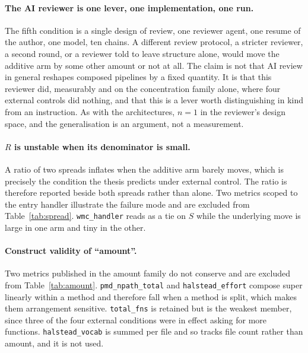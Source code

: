 \documentclass[11pt,a4paper]{article}
\begin{document}
\paragraph{The AI reviewer is one lever, one implementation, one run.} The fifth
condition is a single design of review, one reviewer agent, one resume of the
author, one model, ten chains. A different review protocol, a stricter reviewer,
a second round, or a reviewer told to leave structure alone, would move the
additive arm by some other amount or not at all. The claim is not that AI review
in general reshapes composed pipelines by a fixed quantity. It is that this
reviewer did, measurably and on the concentration family alone, where four
external controls did nothing, and that this is a lever worth distinguishing in
kind from an instruction. As with the architectures, $n = 1$ in the reviewer's
design space, and the generalisation is an argument, not a measurement.

\paragraph{$R$ is unstable when its denominator is small.} A ratio of two
spreads inflates when the additive arm barely moves, which is precisely the
condition the thesis predicts under external control. The ratio is therefore
reported beside both spreads rather than alone. Two metrics scoped to the entry
handler illustrate the failure mode and are excluded from Table~\ref{tab:spread}.
\texttt{wmc\_handler} reads as a tie on $S$ while the underlying move is large in
one arm and tiny in the other.

\paragraph{Construct validity of ``amount''.} Two metrics published in the
amount family do not conserve and are excluded from Table~\ref{tab:amount}.
\texttt{pmd\_npath\_total} and \texttt{halstead\_effort} compose super linearly
within a method and therefore fall when a method is split, which makes them
arrangement sensitive. \texttt{total\_fns} is retained but is the weakest
member, since three of the four external conditions were in effect asking for more
functions. \texttt{halstead\_vocab} is summed per file and so tracks file count
rather than amount, and it is not used.
\end{document}
